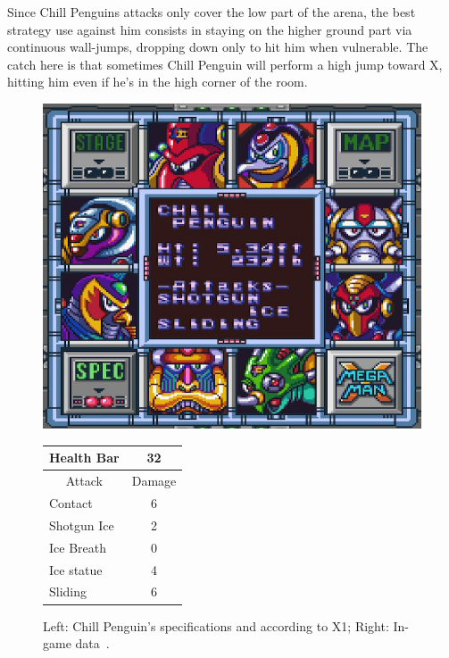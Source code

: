Since Chill Penguins attacks only cover the low part of the arena,  the best strategy use against him consists in staying on the higher ground part via continuous wall-jumps, dropping down only to hit him when vulnerable. The catch here is that sometimes Chill Penguin will perform a high jump toward X, hitting him even if he's in the high corner of the room. 

\begin{figure}[htp]
	\begin{minipage}[c]{0.45\linewidth}
		\vspace{0pt}
		\centering
		\includegraphics[width=\linewidth]{figures/X1/Chill_penguin/Chill_penguin_specs.jpg}
	\end{minipage}
	\begin{minipage}[c]{0.45\linewidth}
		\centering
		\vspace{0pt}
		\begin{tabular}[h]{l c}
			\toprule
			Health Bar & 32\\
			\midrule
			\multicolumn{1}{c}{Attack} & \multicolumn{1}{c}{Damage}\\
			Contact & 6\\
			Shotgun Ice & 2\\
			Ice Breath & 0\\
			Ice statue & 4\\
			Sliding & 6\\
			\bottomrule
		\end{tabular}
	\end{minipage}
	\caption{Left: Chill Penguin's specifications and according to X1; Right: In-game data~\cite{wiki:Chill_Penguin}. }
	\label{Penguin_specs}
\end{figure}

